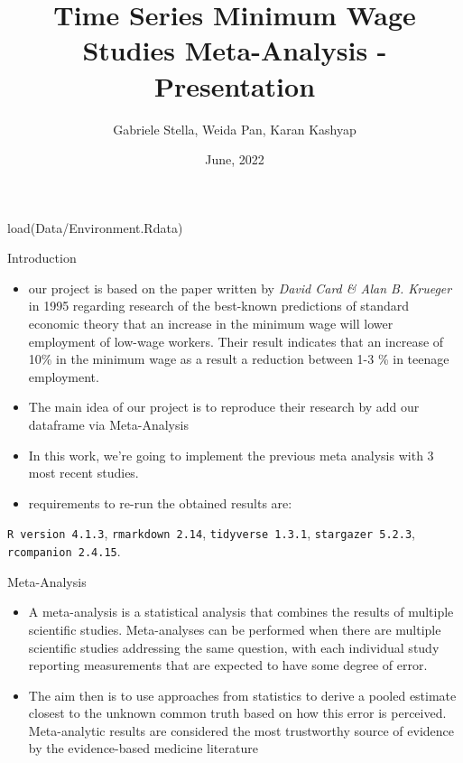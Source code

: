 \documentclass[
  9 pt,
  ignorenonframetext,
]{beamer}
\title{Time Series Minimum Wage Studies Meta-Analysis - Presentation}
\author{Gabriele Stella, Weida Pan, Karan Kashyap}
\date{June, 2022}
\newenvironment{Shaded}{\begin{snugshade}}{\end{snugshade}}
\newcommand{\FunctionTok}[1]{\textcolor[rgb]{0.00,0.00,0.00}{#1}}
\newcommand{\NormalTok}[1]{#1}
\newcommand{\StringTok}[1]{\textcolor[rgb]{0.31,0.60,0.02}{#1}}
\begin{document}
\frame{\titlepage}

\begin{frame}[fragile]
\begin{Shaded}
\begin{Highlighting}[]
\FunctionTok{load}\NormalTok{(}\StringTok{\textquotesingle{}Data/Environment.Rdata\textquotesingle{}}\NormalTok{)}
\end{Highlighting}
\end{Shaded}
\end{frame}

\begin{frame}[fragile]{Introduction}
\protect\hypertarget{introduction}{}
\begin{itemize}
\item
  our project is based on the paper written by \emph{David Card \& Alan
  B. Krueger} in 1995 regarding research of the best-known predictions
  of standard economic theory that an increase in the minimum wage will
  lower employment of low-wage workers. Their result indicates that an
  increase of 10\% in the minimum wage as a result a reduction between
  1-3 \% in teenage employment.
\item
  The main idea of our project is to reproduce their research by add our
  dataframe via Meta-Analysis
\item
  In this work, we're going to implement the previous meta analysis with
  3 most recent studies.
\item
  requirements to re-run the obtained results are:
\end{itemize}

\texttt{R\ version\ 4.1.3}, \texttt{rmarkdown\ 2.14},
\texttt{tidyverse\ 1.3.1}, \texttt{stargazer\ 5.2.3},
\texttt{rcompanion\ 2.4.15}.
\end{frame}

\begin{frame}{Meta-Analysis}
\protect\hypertarget{meta-analysis}{}
\begin{itemize}
\item
  A meta-analysis is a statistical analysis that combines the results of
  multiple scientific studies. Meta-analyses can be performed when there
  are multiple scientific studies addressing the same question, with
  each individual study reporting measurements that are expected to have
  some degree of error.
\item
  The aim then is to use approaches from statistics to derive a pooled
  estimate closest to the unknown common truth based on how this error
  is perceived. Meta-analytic results are considered the most
  trustworthy source of evidence by the evidence-based medicine
  literature
\end{itemize}
\end{frame}
\end{document}
